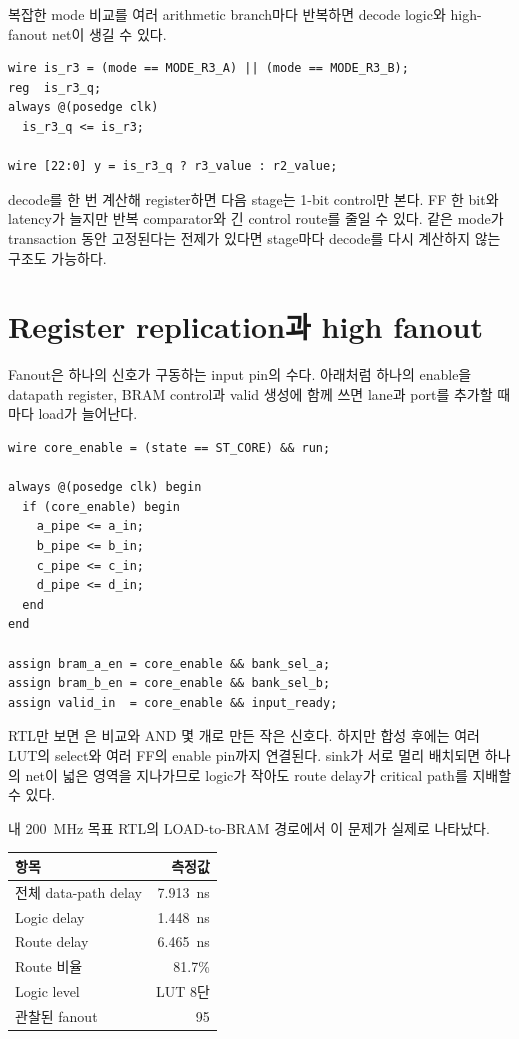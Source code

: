 복잡한 mode 비교를 여러 arithmetic branch마다 반복하면 decode logic와 high-fanout
net이 생길 수 있다.

\begin{lstlisting}
wire is_r3 = (mode == MODE_R3_A) || (mode == MODE_R3_B);
reg  is_r3_q;
always @(posedge clk)
  is_r3_q <= is_r3;

wire [22:0] y = is_r3_q ? r3_value : r2_value;
\end{lstlisting}

decode를 한 번 계산해 register하면 다음 stage는 1-bit control만 본다. FF 한
bit와 latency가 늘지만 반복 comparator와 긴 control route를 줄일 수 있다.
같은 mode가 transaction 동안 고정된다는 전제가 있다면 stage마다 decode를 다시
계산하지 않는 구조도 가능하다.

\section{Register replication과 high fanout}

Fanout은 하나의 신호가 구동하는 input pin의 수다. 아래처럼 하나의 enable을
datapath register, BRAM control과 valid 생성에 함께 쓰면 lane과 port를 추가할
때마다 load가 늘어난다.

\begin{lstlisting}
wire core_enable = (state == ST_CORE) && run;

always @(posedge clk) begin
  if (core_enable) begin
    a_pipe <= a_in;
    b_pipe <= b_in;
    c_pipe <= c_in;
    d_pipe <= d_in;
  end
end

assign bram_a_en = core_enable && bank_sel_a;
assign bram_b_en = core_enable && bank_sel_b;
assign valid_in  = core_enable && input_ready;
\end{lstlisting}

RTL만 보면 은 비교와 AND 몇 개로 만든 작은 신호다. 하지만
합성 후에는 여러 LUT의 select와 여러 FF의 enable pin까지 연결된다. sink가 서로
멀리 배치되면 하나의 net이 넓은 영역을 지나가므로 logic가 작아도 route delay가
critical path를 지배할 수 있다.

내 200~MHz 목표 RTL의 LOAD-to-BRAM 경로에서 이 문제가 실제로 나타났다.

\begin{center}
\begin{tabular}{lr}
\toprule
항목 & 측정값 \\
\midrule
전체 data-path delay & 7.913~ns \\
Logic delay & 1.448~ns \\
Route delay & 6.465~ns \\
Route 비율 & 81.7\% \\
Logic level & LUT 8단 \\
관찰된 fanout & 95 \\
\bottomrule
\end{tabular}
\end{center}

